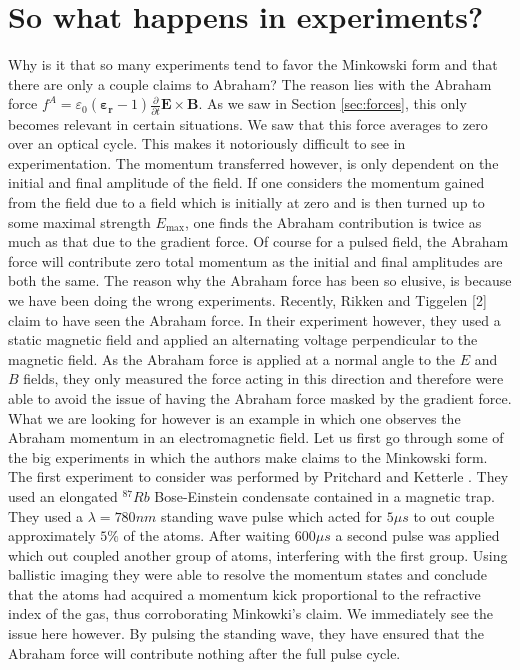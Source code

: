 \documentclass[twocolumn,english,pra,aps,superscriptaddress,floatfix]{revtex4-1}
\begin{document}
\section{So what happens in experiments?}
\label{sec:experiment}
Why is it that so many experiments tend to favor the Minkowski form and that there are only a couple claims to Abraham? The reason lies with the Abraham force $f^A=\varepsilon_0\left(\mathbf{\varepsilon_r}-1\right)\frac{\partial}{\partial t}\mathbf{E}\times\mathbf{B}$. As we saw in Section \ref{sec:forces}, this only becomes relevant in certain situations.  We saw that this force averages to zero over an optical cycle. This makes it notoriously difficult to see in experimentation. The momentum transferred however, is only dependent on the initial and final amplitude of the field.  If one considers the momentum gained from the field due to a field which is initially at zero and is then turned up to some maximal strength $E_{\mathrm{max}}$, one finds the Abraham contribution is twice as much as that due to the gradient force.  Of course for a pulsed field, the Abraham force will contribute zero total momentum as the initial and final amplitudes are both the same.  The reason why the Abraham force has been so elusive, is because we have been doing the wrong experiments. Recently, Rikken and Tiggelen [2] claim to have seen the Abraham force.  In their experiment however, they used a static magnetic field and applied an alternating voltage perpendicular to the magnetic field.  As the Abraham force is applied at a normal angle to the $E$ and $B$ fields, they only measured the force acting in this direction and therefore were able to avoid the issue of having the Abraham force masked by the gradient force.  What we are looking for however is an example in which one observes the Abraham momentum in an electromagnetic field.  Let us first go through some of the big experiments in which the authors make claims to the Minkowski form.
\\
The first experiment to consider was performed by Pritchard and Ketterle \cite{ketterle}.  They used an elongated $^{87}Rb$ Bose-Einstein condensate contained in a magnetic trap.  They used a $\lambda=780 nm$ standing wave pulse which acted for $5 \mu s$ to out couple approximately $5\%$ of the atoms.  After waiting $600 \mu s$ a second pulse was applied which out coupled another group of atoms, interfering with the first group.  Using ballistic imaging they were able to resolve the momentum states and conclude that the atoms had acquired a momentum kick proportional to the refractive index of the gas, thus corroborating Minkowki's claim.  We immediately see the issue here however.  By pulsing the standing wave, they have ensured that the Abraham force will contribute nothing after the full pulse cycle.  
\end{document}

